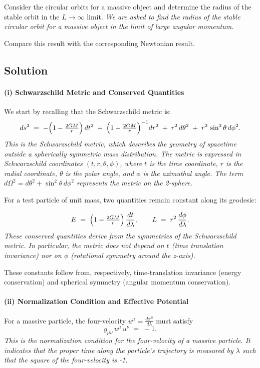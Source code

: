Consider the circular orbits for a massive object and determine the radius of the stable orbit in the $L \rightarrow \infty$ limit. \textit{We are asked to find the radius of the stable circular orbit for a massive object in the limit of large angular momentum.}

Compare this result with the corresponding Newtonian result.

\subsection*{Solution}

\paragraph{(i) Schwarzschild Metric and Conserved Quantities}

We start by recalling that the Schwarzschild metric is:
\[
ds^2 \;=\; -\Bigl(1 - \tfrac{2GM}{r}\Bigr)\,dt^2
\;+\;\Bigl(1 - \tfrac{2GM}{r}\Bigr)^{-1} dr^2
\;+\; r^2\,d\theta^2
\;+\; r^2\,\sin^2\theta\,d\phi^2.
\]
\textit{This is the Schwarzschild metric, which describes the geometry of spacetime outside a spherically symmetric mass distribution. The metric is expressed in Schwarzschild coordinates $(t, r, \theta, \phi)$, where $t$ is the time coordinate, $r$ is the radial coordinate, $\theta$ is the polar angle, and $\phi$ is the azimuthal angle. The term $d\Omega^2 = d\theta^2 + \sin^2\theta \, d\phi^2$ represents the metric on the 2-sphere.}

For a test particle of unit mass, two quantities remain constant along its geodesic:

\[
E \;=\; \Bigl(1 - \tfrac{2GM}{r}\Bigr)\,\frac{dt}{d\lambda},
\quad\quad
L \;=\; r^{2}\,\frac{d\phi}{d\lambda}.
\]
\textit{These conserved quantities derive from the symmetries of the Schwarzschild metric. In particular, the metric does not depend on $t$ (time translation invariance) nor on $\phi$ (rotational symmetry around the z-axis).}

These constants follow from, respectively, time-translation invariance (energy conservation) and spherical symmetry (angular momentum conservation).

\paragraph{(ii) Normalization Condition and Effective Potential}

For a massive particle, the four-velocity $u^\mu = \frac{dx^\mu}{d\lambda}$ must satisfy
\[
g_{\mu\nu}\,u^\mu\,u^\nu \;=\; -1.
\]
\textit{This is the normalization condition for the four-velocity of a massive particle. It indicates that the proper time along the particle's trajectory is measured by $\lambda$ such that the square of the four-velocity is -1.}

